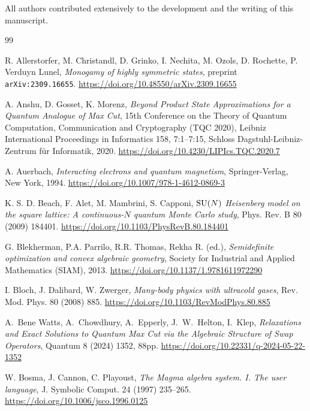 \documentclass[12pt,dvipsnames,accepted=2016-08-18,a4paper,onecolumn]{quantumarticle}
\numberwithin{equation}{section}
\theoremstyle{definition}
\begin{document}
All authors contributed extensively to the development and the writing of this manuscript.











\begin{thebibliography}{99}

R. Allerstorfer, M. Christandl, D. Grinko, I. Nechita, M. Ozols, D. Rochette, P. Verduyn Lunel, \textit{Monogamy of highly symmetric states},  
preprint \texttt{arXiv:2309.16655}. \url{https://doi.org/10.48550/arXiv.2309.16655}

A. Anshu, D. Gosset, K. Morenz, \textit{Beyond Product State Approximations for a Quantum Analogue of Max Cut}, 15th Conference on the Theory of Quantum Computation, Communication and Cryptography (TQC 2020), Leibniz International Proceedings in Informatics 158, 7:1--7:15, Schloss Dagstuhl-Leibniz-Zentrum f\"ur Informatik, 2020.
\url{https://doi.org/10.4230/LIPIcs.TQC.2020.7}

A. Auerbach, 
\textit{Interacting electrons and quantum magnetism}, 
Springer-Verlag, New York, 1994. \url{https://doi.org/10.1007/978-1-4612-0869-3}

K. S. D. Beach, F. Alet, M. Mambrini, S. Capponi, 
\textit{${\rm SU}(N)$ Heisenberg
model on the square lattice: A continuous-$N$ quantum Monte Carlo study},
Phys. Rev. B 80 (2009) 184401. \url{https://doi.org/10.1103/PhysRevB.80.184401}

G. Blekherman, P.A. Parrilo, R.R. Thomas, Rekha R. (ed.),
\textit{Semidefinite optimization and convex algebraic geometry}, Society for Industrial and Applied Mathematics (SIAM), 2013. \url{https://doi.org/10.1137/1.9781611972290}

I. Bloch, J. Dalibard, W. Zwerger, 
\textit{Many-body physics with ultracold gases}, 
Rev. Mod. Phys. 80 (2008) 885. \url{https://doi.org/10.1103/RevModPhys.80.885}

 A.~Bene Watts, A.~Chowdhury, A.~Epperly, J.~W.~Helton, I.~Klep,
 \textit{Relaxations and Exact Solutions to Quantum Max Cut via the Algebraic Structure of Swap Operators}, Quantum 8 (2024) 1352, 88pp. \url{https://doi.org/10.22331/q-2024-05-22-1352}

W. Bosma, J. Cannon, C. Playoust, 
\textit{The Magma algebra system. I. The user language}, 
J. Symbolic Comput. 24 (1997) 235--265. \url{https://doi.org/10.1006/jsco.1996.0125}



\end{thebibliography}
\end{document}
